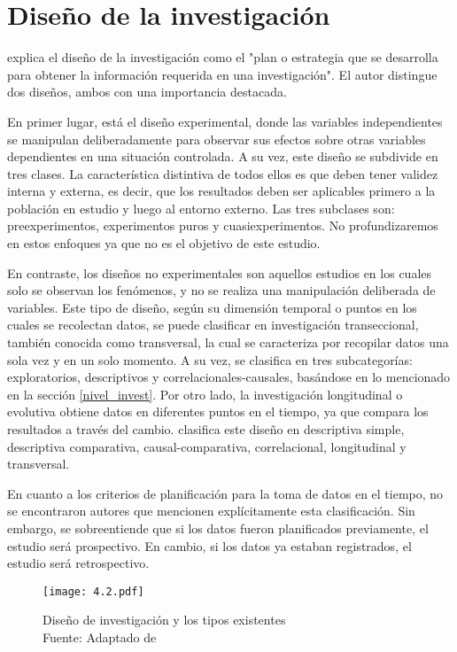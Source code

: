 \section{Diseño de la investigación}
\cite[128]{HernandezSampieri2014} explica el diseño de la investigación como el "plan o estrategia que se desarrolla para obtener la información requerida en una investigación". El autor distingue dos diseños, ambos con una importancia destacada. 

En primer lugar, está el diseño experimental, donde las variables independientes se manipulan deliberadamente para observar sus efectos sobre otras variables dependientes en una situación controlada. A su vez, este diseño se subdivide en tres clases. La característica distintiva de todos ellos es que deben tener validez interna y externa, es decir, que los resultados deben ser aplicables primero a la población en estudio y luego al entorno externo. Las tres subclases son: preexperimentos, experimentos puros y cuasiexperimentos. No profundizaremos en estos enfoques ya que no es el objetivo de este estudio.

En contraste, los diseños no experimentales son aquellos estudios en los cuales solo se observan los fenómenos, y no se realiza una manipulación deliberada de variables. Este tipo de diseño, según su dimensión temporal o puntos en los cuales se recolectan datos, se puede clasificar en investigación transeccional, también conocida como transversal, la cual se caracteriza por recopilar datos una sola vez y en un solo momento. A su vez, se clasifica en tres subcategorías: exploratorios, descriptivos y correlacionales-causales, basándose en lo mencionado en la sección \ref{nivel_invest}. Por otro lado, la investigación longitudinal o evolutiva obtiene datos en diferentes puntos en el tiempo, ya que compara los resultados a través del cambio.\cite[341]{NaupasPaitan2014} clasifica este diseño en descriptiva simple, descriptiva comparativa, causal-comparativa, correlacional, longitudinal y transversal.

En cuanto a los criterios de planificación para la toma de datos en el tiempo, no se encontraron autores que mencionen explícitamente esta clasificación. Sin embargo, se sobreentiende que si los datos fueron planificados previamente, el estudio será prospectivo. En cambio, si los datos ya estaban registrados, el estudio será retrospectivo.
\vspace{5mm}
\begin{figure}[h]
\centering
\captionsetup{width=0.95\textwidth}
\texttt{[image: 4.2.pdf]}
\caption[Diseño de investigación]{Diseño de investigación y los tipos existentes \\ Fuente: Adaptado de \cite[155]{HernandezSampieri2014} }
\label{fig:dis_inv}
\end{figure}

